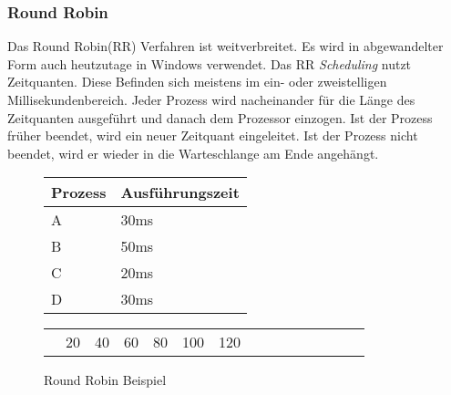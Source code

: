 \subsubsection{Round Robin}
Das Round Robin(RR) Verfahren ist weitverbreitet. Es wird in abgewandelter Form auch heutzutage in Windows verwendet.\cite{Windows:Lohmann} Das RR \textit{Scheduling} nutzt Zeitquanten. Diese Befinden sich meistens im ein- oder zweistelligen Millisekundenbereich. Jeder Prozess wird nacheinander für die Länge des Zeitquanten ausgeführt und danach dem Prozessor einzogen. Ist der Prozess früher beendet, wird ein neuer Zeitquant eingeleitet. Ist der Prozess nicht beendet, wird er wieder in die Warteschlange am Ende angehängt.\\
\begin{figure}[h]
    \centering
    \begin{tabular}{| l | l |}
        \hline
        Prozess & Ausführungszeit\\
        \hline
        \cellcolor{red!20}A & 30ms\\
        \hline
        \cellcolor{blue!20}B & 50ms\\
        \hline
        \cellcolor{green!20}C & 20ms\\
        \hline
        \cellcolor{black!20}D & 30ms\\
        \hline
    \end{tabular}
    \begin{tabular}{|c|c|c|c|c|c|c|c|c|c|c|c|c|c|c|c|c|c|c|c|c|}
        \hline
        \cellcolor{red!20} & \cellcolor{red!20} & \cellcolor{blue!20} & \cellcolor{blue!20} & \cellcolor{green!20} & \cellcolor{green!20} & \cellcolor{black!20} & \cellcolor{black!20} & \cellcolor{red!20} & \cellcolor{blue!20} & \cellcolor{blue!20} & \cellcolor{black!20} & \cellcolor{blue!20}\\
        \hline
        \multicolumn{1}{l}{} & \multicolumn{2}{c}{\tiny 20} & \multicolumn{2}{c}{\tiny 40} & \multicolumn{2}{c}{\tiny 60} & \multicolumn{2}{c}{\tiny 80} & \multicolumn{2}{c}{\tiny 100} & \multicolumn{2}{c}{\tiny 120}\\
    \end{tabular}
    \caption{Round Robin Beispiel}
    \label{RoundRobin}
\end{figure}


